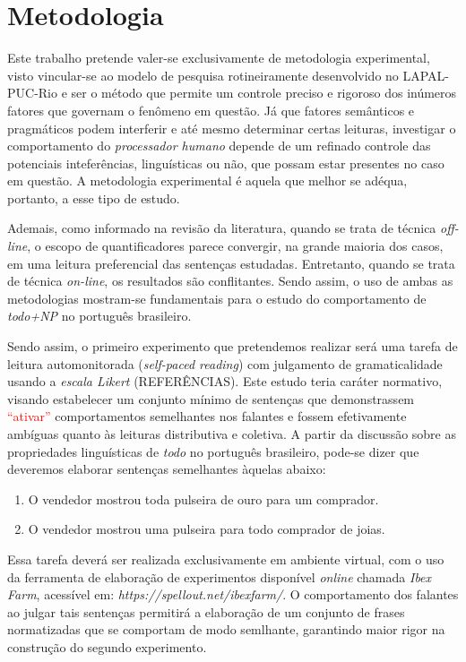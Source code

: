 \chapter{Metodologia}
Este trabalho pretende valer-se exclusivamente de metodologia experimental, visto vincular-se ao modelo de pesquisa rotineiramente desenvolvido no LAPAL-PUC-Rio e ser o método que permite um controle preciso e rigoroso dos inúmeros fatores que governam o fenômeno em questão. Já que fatores semânticos e pragmáticos podem interferir e até mesmo determinar certas leituras, investigar o comportamento do \emph{processador humano} depende de um refinado controle das potenciais inteferências, linguísticas ou não, que possam estar presentes no caso em questão. A metodologia experimental é aquela que melhor se adéqua, portanto, a esse tipo de estudo.

Ademais, como informado na revisão da literatura, quando se trata de técnica \emph{off-line}, o escopo de quantificadores parece convergir, na grande maioria dos casos, em uma leitura preferencial das sentenças estudadas. Entretanto, quando se trata de técnica \emph{on-line}, os resultados são conflitantes. Sendo assim, o uso de ambas as metodologias mostram-se fundamentais para o estudo do comportamento de \emph{todo+NP} no português brasileiro.

Sendo assim, o primeiro experimento que pretendemos realizar será uma tarefa de leitura automonitorada (\emph{self-paced reading}) com julgamento de gramaticalidade usando a \emph{escala Likert} (REFERÊNCIAS). Este estudo teria caráter normativo, visando estabelecer um conjunto mínimo de sentenças que demonstrassem \textcolor{red}{``ativar''} comportamentos semelhantes nos falantes e fossem efetivamente ambíguas quanto às leituras distributiva e coletiva. A partir da discussão sobre as propriedades linguísticas de \emph{todo} no português brasileiro, pode-se dizer que deveremos elaborar sentenças semelhantes àquelas abaixo:

\begin{enumerate}
  \item O vendedor mostrou toda pulseira de ouro para um comprador.
  \item O vendedor mostrou uma pulseira para todo comprador de joias.
\end{enumerate}

Essa tarefa deverá ser realizada exclusivamente em ambiente virtual, com o uso da ferramenta de elaboração de experimentos disponível \emph{online} chamada \emph{Ibex Farm}, acessível em: \emph{https://spellout.net/ibexfarm/}. O comportamento dos falantes ao julgar tais sentenças permitirá a elaboração de um conjunto de frases normatizadas que se comportam de modo semlhante, garantindo maior rigor na construção do segundo experimento.

